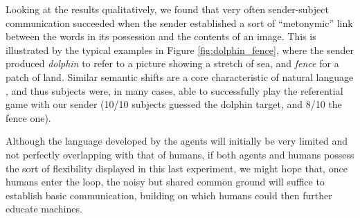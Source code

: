 Looking at the results qualitatively, we found that very often
sender-subject communication succeeded when the sender established a
sort of ``metonymic'' link between the words in its possession and the
contents of an image. This is illustrated by the typical examples in
Figure \ref{fig:dolphin_fence}, where the sender produced
\emph{dolphin} to refer to a picture showing a stretch of sea, and \emph{fence} for a patch of land. Similar semantic shifts are a core characteristic of natural
language \citep[e.g.,][]{Pustejovsky:1995}, and thus 
subjects were, in many cases, able to successfully play the
referential game with our sender (10/10 subjects guessed the dolphin
target, and 8/10 the fence one).

Although the language developed by the agents will initially be very
limited and not perfectly overlapping with that of humans, if both
agents and humans possess the sort of flexibility displayed in this
last experiment, we might hope that, once humans enter the loop, the
noisy but shared common ground will suffice to establish basic
communication, building on which humans could then further educate
machines.








